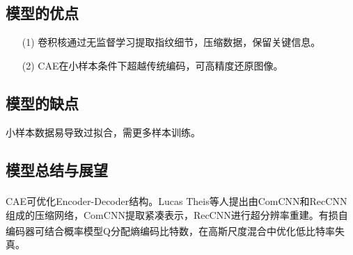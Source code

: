 \documentclass{whutmod}
\newcommand{\upcite}[1]{\textsuperscript{\cite{#1}}}
\begin{document}
        \subsection{模型的优点}
            \begin{itemize}
                \item[(1)] 卷积核通过无监督学习提取指纹细节，压缩数据，保留关键信息。
                \item[(2)] CAE在小样本条件下超越传统编码，可高精度还原图像。
            \end{itemize}

        \subsection{模型的缺点}
            小样本数据易导致过拟合，需更多样本训练。

        \subsection{模型总结与展望}
            CAE可优化Encoder-Decoder结构。Lucas Theis等人\upcite{16}提出由ComCNN和RecCNN组成的压缩网络，ComCNN提取紧凑表示，RecCNN进行超分辨率重建。有损自编码器可结合概率模型Q分配熵编码比特数\upcite{17,18}，在高斯尺度混合中优化低比特率失真。
\end{document}
